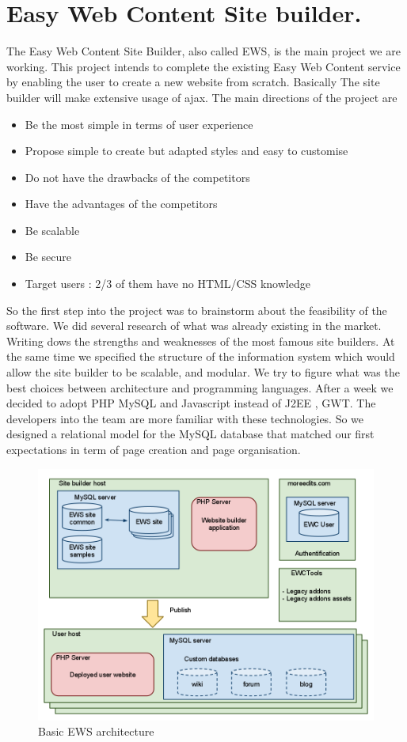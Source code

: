 \chapter{Easy Web Content Site builder.}

The Easy Web Content Site Builder, also called EWS, is the main project we are working. This project intends to complete the existing Easy Web Content service by enabling the user to create a new website from scratch.
Basically The site builder will make extensive usage of ajax. The main directions of the project are
\begin{itemize}
\item Be the most simple in terms of user experience
\item Propose simple to create but adapted styles and easy to customise
\item Do not have the drawbacks of the competitors
\item Have the advantages of the competitors
\item Be scalable
\item Be secure
\item Target users : 2/3 of them have no HTML/CSS knowledge
\end{itemize}

So the first step into the project was to brainstorm about the feasibility of the software. We did several research of what was already existing in the market. Writing dows the strengths and weaknesses of the most famous site builders. At the same time we specified the structure of the information system which would allow the site builder to be scalable, and modular. We try to figure what was the best choices between architecture and programming languages. After a week we decided to adopt PHP MySQL and Javascript instead of J2EE , GWT. The developers into the team are more familiar with these technologies. So we designed a relational model for the MySQL database that matched our first expectations in term of page creation and page organisation.

\begin{figure}[!ht]
\centering
\includegraphics[width=.55\textwidth]{img/ews_archi_before.png}
\caption{Basic EWS architecture }
\label{figure:ews_archi_after}
\end{figure}


